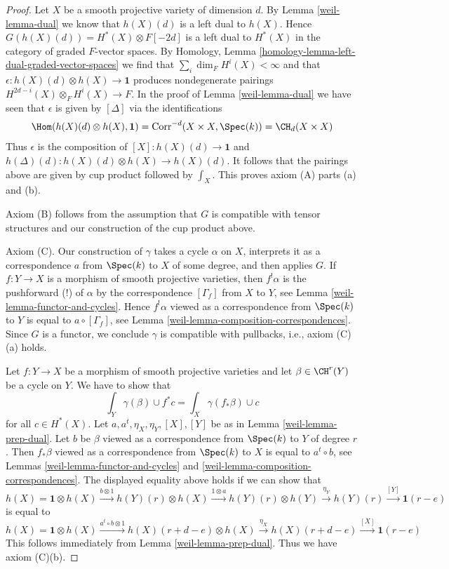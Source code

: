 \begin{proof}
\medskip\noindent
Let $X$ be a smooth projective variety of dimension $d$.
By Lemma \ref{weil-lemma-dual}
we know that $h(X)(d)$ is a left dual to $h(X)$. Hence
$G(h(X)(d)) = H^*(X) \otimes F[-2d]$ is a left dual to
$H^*(X)$ in the category of graded $F$-vector spaces.
By Homology, Lemma \ref{homology-lemma-left-dual-graded-vector-spaces}
we find that $\sum_i \dim_F H^i(X) < \infty$ and that
$\epsilon : h(X)(d) \otimes h(X) \to \mathbf{1}$ produces
nondegenerate pairings $H^{2d - i}(X) \otimes_F H^i(X) \to F$.
In the proof of Lemma \ref{weil-lemma-dual} we have seen that
$\epsilon$ is given by $[\Delta]$ via the identifications
$$
\Hom(h(X)(d) \otimes h(X), \mathbf{1}) =
\text{Corr}^{-d}(X \times X, \Spec(k)) =
\CH_d(X \times X)
$$
Thus $\epsilon$ is the composition of $[X] : h(X)(d) \to \mathbf{1}$
and $h(\Delta)(d) : h(X)(d) \otimes h(X) \to h(X)(d)$. It follows
that the pairings above are given by cup product followed by
$\int_X$. This proves axiom (A) parts (a) and (b).

\medskip\noindent
Axiom (B) follows from the assumption that $G$ is compatible
with tensor structures and our construction of the cup product above.

\medskip\noindent
Axiom (C). Our construction of $\gamma$ takes a cycle $\alpha$ on $X$,
interprets it as a correspondence $a$ from $\Spec(k)$ to $X$ of some degree,
and then applies $G$. If $f : Y \to X$ is a morphism of smooth projective
varieties, then $f^!\alpha$ is the pushforward (!) of $\alpha$
by the correspondence $[\Gamma_f]$ from $X$ to $Y$, see
Lemma \ref{weil-lemma-functor-and-cycles}. Hence
$f^!\alpha$ viewed as a correspondence from $\Spec(k)$ to $Y$
is equal to $a \circ [\Gamma_f]$, see
Lemma \ref{weil-lemma-composition-correspondences}.
Since $G$ is a functor, we conclude
$\gamma$ is compatible with pullbacks, i.e., axiom (C)(a) holds.

\medskip\noindent
Let $f : Y \to X$ be a morphism of smooth projective varieties and
let $\beta \in \CH^r(Y)$ be a cycle on $Y$. We have to show that
$$
\int_Y \gamma(\beta) \cup f^*c = \int_X \gamma(f_*\beta) \cup c
$$
for all $c \in H^*(X)$. Let $a, a^t, \eta_X, \eta_Y, [X], [Y]$
be as in Lemma \ref{weil-lemma-prep-dual}.
Let $b$ be $\beta$ viewed as a correspondence from $\Spec(k)$ to $Y$
of degree $r$. Then $f_*\beta$ viewed as a correspondence from
$\Spec(k)$ to $X$ is equal to $a^t \circ b$, see
Lemmas \ref{weil-lemma-functor-and-cycles} and
\ref{weil-lemma-composition-correspondences}.
The displayed equality above holds if we can show that
$$
h(X) = \mathbf{1} \otimes h(X)
\xrightarrow{b \otimes 1}
h(Y)(r) \otimes h(X)
\xrightarrow{1 \otimes a}
h(Y)(r) \otimes h(Y)
\xrightarrow{\eta_Y}
h(Y)(r)
\xrightarrow{[Y]}
\mathbf{1}(r - e)
$$
is equal to
$$
h(X) = \mathbf{1} \otimes h(X)
\xrightarrow{a^t \circ b \otimes 1}
h(X)(r + d - e) \otimes h(X)
\xrightarrow{\eta_X}
h(X)(r + d - e)
\xrightarrow{[X]}
\mathbf{1}(r - e)
$$
This follows immediately from Lemma \ref{weil-lemma-prep-dual}.
Thus we have axiom (C)(b).


\end{proof}
